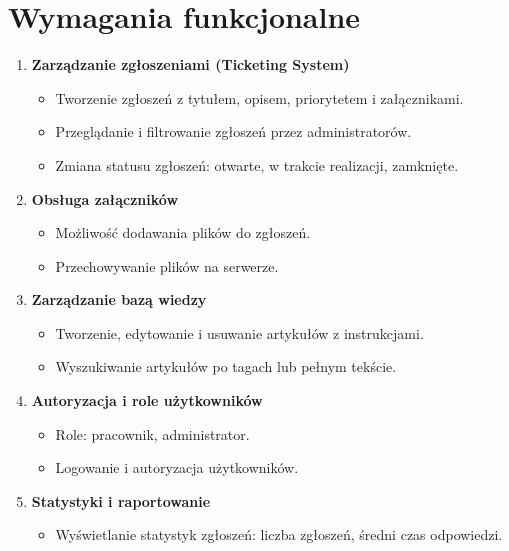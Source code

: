 \documentclass[a4paper,12pt]{article}
\begin{document}
\section{Wymagania funkcjonalne}
\begin{enumerate}
    \item \textbf{Zarządzanie zgłoszeniami (Ticketing System)}
    \begin{itemize}
        \item Tworzenie zgłoszeń z tytułem, opisem, priorytetem i załącznikami.
        \item Przeglądanie i filtrowanie zgłoszeń przez administratorów.
        \item Zmiana statusu zgłoszeń: otwarte, w trakcie realizacji, zamknięte.
    \end{itemize}

    \item \textbf{Obsługa załączników}
    \begin{itemize}
        \item Możliwość dodawania plików do zgłoszeń.
        \item Przechowywanie plików na serwerze.
    \end{itemize}

    \item \textbf{Zarządzanie bazą wiedzy}
    \begin{itemize}
        \item Tworzenie, edytowanie i usuwanie artykułów z instrukcjami.
        \item Wyszukiwanie artykułów po tagach lub pełnym tekście.
    \end{itemize}

    \item \textbf{Autoryzacja i role użytkowników}
    \begin{itemize}
        \item Role: pracownik, administrator.
        \item Logowanie i autoryzacja użytkowników.
    \end{itemize}

    \item \textbf{Statystyki i raportowanie}
    \begin{itemize}
        \item Wyświetlanie statystyk zgłoszeń: liczba zgłoszeń, średni czas odpowiedzi.
    \end{itemize}
\end{enumerate}
\end{document}
